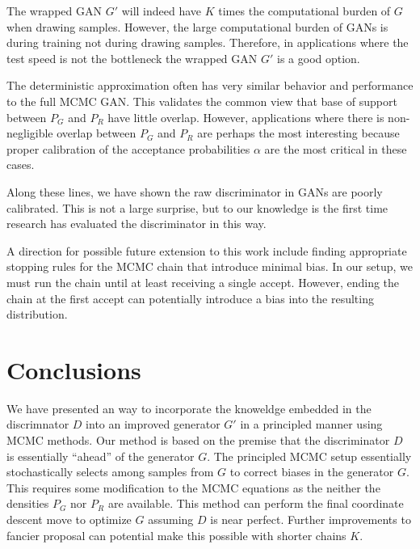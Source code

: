 \documentclass{article}
\begin{document}
The wrapped GAN $G'$ will indeed have $K$ times the computational burden of $G$ when drawing samples.
However, the large computational burden of GANs is during training not during drawing samples.
Therefore, in applications where the test speed is not the bottleneck the wrapped GAN $G'$ is a good option.

The deterministic approximation often has very similar behavior and performance to the full MCMC GAN\@.
This validates the common view that base of support between $P_G$ and $P_R$ have little overlap.
However, applications where there is non-negligible overlap between $P_G$ and $P_R$ are perhaps the most interesting because proper calibration of the acceptance probabilities $\alpha$ are the most critical in these cases.

Along these lines, we have shown the raw discriminator in GANs are poorly calibrated.
This is not a large surprise, but to our knowledge is the first time research has evaluated the discriminator in this way.

A direction for possible future extension to this work include finding appropriate stopping rules for the MCMC chain that introduce minimal bias.
In our setup, we must run the chain until at least receiving a single accept.
However, ending the chain at the first accept can potentially introduce a bias into the resulting distribution.

\section{Conclusions}

We have presented an way to incorporate the knoweldge embedded in the discrimnator $D$ into an improved generator $G'$ in a principled manner using MCMC methods.
Our method is based on the premise that the discriminator $D$ is essentially ``ahead'' of the generator $G$.
The principled MCMC setup essentially stochastically selects among samples from $G$ to correct biases in the generator $G$.
This requires some modification to the MCMC equations as the neither the densities $P_G$ nor $P_R$ are available.
This method can perform the final coordinate descent move to optimize $G$ assuming $D$ is near perfect.
Further improvements to fancier proposal can potential make this possible with shorter chains $K$.
\end{document}
